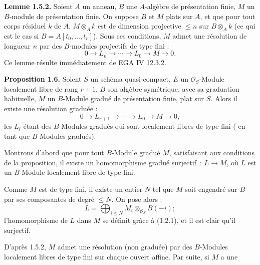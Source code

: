 \textbf{Lemme 1.5.2.} Soient \(A\) un anneau, \(B\) une \(A\)-algèbre de présentation finie, \(M\) un \(B\)-module de présentation finie. On suppose \(B\) et \(M\) plats sur \(A\), et que pour tout corps résiduel \(k\) de \(A\), \(M\otimes_A k\) est de dimension projective \(\leq n\) sur \(B\otimes_A k\) (ce qui est le cas si \(B=A[t_0,\ldots,t_r]\)). Sous ces conditions, \(M\) admet une résolution de longueur \(n\) par des \(B\)-modules projectifs de type fini :
\[
  0\longrightarrow L_n\longrightarrow\cdots\longrightarrow L_0\longrightarrow M\longrightarrow 0.
\]
Ce lemme résulte immédiatement de EGA IV 12.3.2.

\textbf{Proposition 1.6.} Soient \(S\) un schéma quasi-compact, \(E\) un \(\mathcal O_S\)-Module localement libre de rang \(r+1\), \(B\) son algèbre symétrique, avec sa graduation habituelle, \(M\) un \(B\)-Module gradué de présentation finie, plat sur \(S\). Alors il existe une résolution graduée :
\[
  0\longrightarrow L_{r+1}\longrightarrow\cdots\longrightarrow L_0\longrightarrow M\longrightarrow 0,
\]
les \(L_i\) étant des \(B\)-Modules gradués qui sont localement libres de type fini ( en tant que \(B\)-Modules gradués).

Montrons d'abord que pour tout \(B\)-Module gradué \(M\), satisfaisant aux conditions de la proposition, il existe un homomorphisme gradué surjectif~: \(L\to M\), où \(L\) est un \(B\)-Module localement libre de type fini.

Comme \(M\) est de type fini, il existe un entier \(N\) tel que \(M\) soit engendré sur \(B\) par ses composantes de degré \(\leq N\). On pose alors :
\[
  L=\bigoplus_{i\leq N} M_i\otimes_{\mathcal O_S}B(-i);
\]
l'homomorphisme de \(L\) dans \(M\) se définit grâce à (1.2.1), et il est clair qu'il surjectif.

D'après 1.5.2, \(M\) admet une résolution (non graduée) par des \(B\)-Modules localement libres de type fini sur chaque ouvert affine. Par suite, si \(M\) a une
